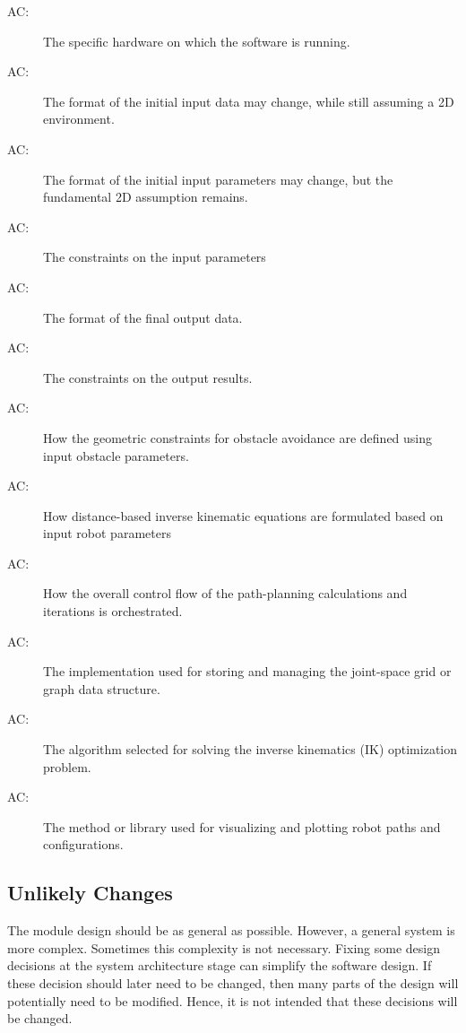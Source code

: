 \documentclass[12pt, titlepage]{article}
\newcounter{acnum}
\newcommand{\actheacnum}{AC\theacnum}
\begin{document}
\begin{description}
\item[ \actheacnum \label{ac1}:] The specific
  hardware on which the software is running.
\item[ \actheacnum \label{ac2}:] The format of the initial input data may change, while still assuming a 2D environment.
\item[ \actheacnum \label{ac3}:] The format of the initial input parameters may change, but the fundamental 2D assumption remains.
\item[ \actheacnum \label{ac4}:]The constraints on the input parameters

\item[ \actheacnum \label{ac5}:] The format of the final output data.

\item[ \actheacnum \label{ac6}:] The constraints on the output results.
\item[ \actheacnum \label{ac7}:] How the geometric constraints for obstacle avoidance are defined using input obstacle parameters.
\item[ \actheacnum \label{ac8}:] How distance-based inverse kinematic equations are formulated based on input robot parameters
\item[ \actheacnum \label{ac9}:] How the overall control flow of the path-planning calculations and iterations is orchestrated.
\item[ \actheacnum \label{ac10}:] The implementation used for storing and managing the joint-space grid or graph data structure.
\item[ \actheacnum \label{ac11}:] The algorithm selected for solving the inverse kinematics (IK) optimization problem.
\item[ \actheacnum \label{ac12}:] The method or library used for visualizing and plotting robot paths and configurations.
\end{description}

\subsection{Unlikely Changes} \label{SecUchange}

The module design should be as general as possible. However, a general system is
more complex. Sometimes this complexity is not necessary. Fixing some design
decisions at the system architecture stage can simplify the software design. If
these decision should later need to be changed, then many parts of the design
will potentially need to be modified. Hence, it is not intended that these
decisions will be changed.
\end{document}
